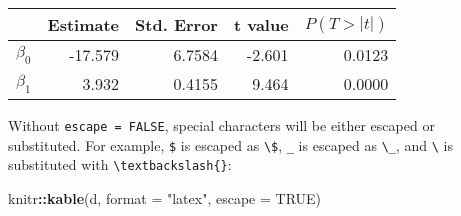 \documentclass[
  11pt,
]{krantz}
\newenvironment{Shaded}{\begin{snugshade}}{\end{snugshade}}
\newcommand{\DataTypeTok}[1]{\textcolor[rgb]{0.27,0.27,0.27}{#1}}
\newcommand{\ExtensionTok}[1]{#1}
\newcommand{\FunctionTok}[1]{\textcolor[rgb]{0,0,0}{#1}}
\newcommand{\KeywordTok}[1]{\textcolor[rgb]{0.27,0.27,0.27}{\textbf{#1}}}
\newcommand{\NormalTok}[1]{#1}
\newcommand{\OperatorTok}[1]{\textcolor[rgb]{0.43,0.43,0.43}{\textbf{#1}}}
\newcommand{\OtherTok}[1]{\textcolor[rgb]{0.37,0.37,0.37}{#1}}
\newcommand{\StringTok}[1]{\textcolor[rgb]{0.5,0.5,0.5}{#1}}
\begin{document}
\begin{tabular}{l|r|r|r|r}
\hline
  & Estimate & Std. Error & t value & $P(T > |t|)$\\
\hline
$\beta_0$ & -17.579 & 6.7584 & -2.601 & 0.0123\\
\hline
$\beta_1$ & 3.932 & 0.4155 & 9.464 & 0.0000\\
\hline
\end{tabular}

Without \texttt{escape\ =\ FALSE}, special characters will be either escaped or substituted. For example, \texttt{\$} is escaped as \texttt{\textbackslash{}\$}, \texttt{\_} is escaped as \texttt{\textbackslash{}\_}, and \texttt{\textbackslash{}} is substituted with \texttt{\textbackslash{}textbackslash\{\}}:

\begin{Shaded}
\begin{Highlighting}[]
\NormalTok{knitr}\OperatorTok{::}\KeywordTok{kable}\NormalTok{(d, }\DataTypeTok{format =} \StringTok{"latex"}\NormalTok{, }\DataTypeTok{escape =} \OtherTok{TRUE}\NormalTok{)}
\end{Highlighting}
\end{Shaded}

\begin{Shaded}
\end{Shaded}
\end{document}
